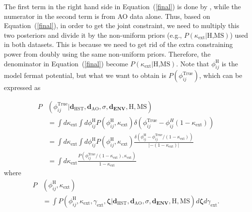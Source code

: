 \documentclass[useAMS,usenatbib]{mnras}
\newcommand{\eref}[1]{Equation~(\ref{#1})}
\begin{document}
The first term in the right hand side in \eref{final} is done by \citet{WongEtal17}, while the numerator in the second term is from AO data alone. Thus, based on \eref{final}, in order to get the joint constraint, we need to multiply this two posteriors and divide it by the non-uniform priors (e.g., $P(\kappa_{\textrm{ext}}|\textrm{H,MS})$) used in both datasets. This is because we need to get rid of the extra constraining power from doubly using the same non-uniform priors.
Therefore, the denominator in \eref{final} become $P(\kappa_{\textrm{ext}}|\textrm{H,MS})$.
Note that $\phi_{ij}^{\textrm{H}}$ is the model fermat potential, but what we want to obtain is $P(\phi_{ij}^{\textrm{True}})$, which can be expressed as

\begin{equation}
\begin{split}
P&(\phi_{ij}^{\textrm{True}}|\bm{d}_{\textrm{HST}},\bm{d}_{\textrm{AO}},\sigma, \bm{d_{\textrm{ENV}}},\textrm{H},\textrm{MS})\\
    &=\int d\kappa_{\textrm{ext}}\int d\phi^{\textrm{H}}_{ij}P(\phi^{\textrm{H}}_{ij},\kappa_{\textrm{ext}})\delta(\phi^{\textrm{True}}_{ij}-\phi^{H}_{ij}(1-\kappa_{\textrm{ext}}))\\
    &=\int d\kappa_{\textrm{ext}}\int d\phi^{\textrm{H}}_{ij}P(\phi^{\textrm{H}}_{ij},\kappa_{\textrm{ext}})\frac{\delta(\phi^{\textrm{H}}_{ij}-\phi^{\textrm{True}}_{ij}/(1-\kappa_{\textrm{ext}}))}{|-(1-\kappa_{\textrm{ext}})|}\\
    &=\int d\kappa_{\textrm{ext}}\frac{P(\phi^{\textrm{True}}_{ij}/(1-\kappa_{\textrm{ext}}),\kappa_{\textrm{ext}})}{1-\kappa_{\textrm{ext}}}
\end{split}
\end{equation}
where 
\begin{equation}
\begin{split}
P&(\phi^{\textrm{H}}_{ij},\kappa_{\textrm{ext}})\\
&=\int P(\phi_{ij}^{\textrm{H}},\kappa_{\textrm{ext}},\gamma_{\textrm{ext}},\bm{\zeta}|\bm{d}_{\textrm{HST}},\bm{d}_{\textrm{AO}},\sigma, \bm{d_{\textrm{ENV}}},\textrm{H},\textrm{MS}) d\bm{\zeta} d\gamma_{\textrm{ext}}.
\end{split}
\end{equation}
\end{document}
